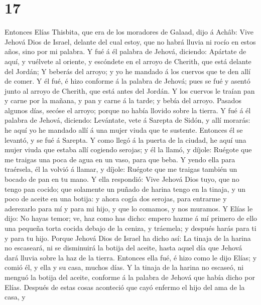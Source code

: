 \hypertarget{section-16}{%
\section{17}\label{section-16}}

 Entonces Elías Thisbita, que era de los moradores de
Galaad, dijo á Achâb: Vive Jehová Dios de Israel, delante del cual
estoy, que no habrá lluvia ni rocío en estos años, sino por mi palabra.
 Y fué á él palabra de Jehová, diciendo: 
Apártate de aquí, y vuélvete al oriente, y escóndete en el arroyo de
Cherith, que está delante del Jordán;  Y beberás del arroyo;
y yo he mandado á los cuervos que te den allí de comer.  Y
él fué, é hizo conforme á la palabra de Jehová; pues se fué y asentó
junto al arroyo de Cherith, que está antes del Jordán.  Y
los cuervos le traían pan y carne por la mañana, y pan y carne á la
tarde; y bebía del arroyo.  Pasados algunos días, secóse el
arroyo; porque no había llovido sobre la tierra.  Y fué á él
palabra de Jehová, diciendo:  Levántate, vete á Sarepta de
Sidón, y allí morarás: he aquí yo he mandado allí á una mujer viuda que
te sustente.  Entonces él se levantó, y se fué á Sarepta. Y
como llegó á la puerta de la ciudad, he aquí una mujer viuda que estaba
allí cogiendo serojas; y él la llamó, y díjole: Ruégote que me traigas
una poca de agua en un vaso, para que beba.  Y yendo ella
para traérsela, él la volvió á llamar, y díjole: Ruégote que me traigas
también un bocado de pan en tu mano.  Y ella respondió:
Vive Jehová Dios tuyo, que no tengo pan cocido; que solamente un puñado
de harina tengo en la tinaja, y un poco de aceite en una botija: y ahora
cogía dos serojas, para entrarme y aderezarlo para mí y para mi hijo, y
que lo comamos, y nos muramos.  Y Elías le dijo: No hayas
temor; ve, haz como has dicho: empero hazme á mí primero de ello una
pequeña torta cocida debajo de la ceniza, y tráemela; y después harás
para ti y para tu hijo.  Porque Jehová Dios de Israel ha
dicho así: La tinaja de la harina no escaseará, ni se disminuirá la
botija del aceite, hasta aquel día que Jehová dará lluvia sobre la haz
de la tierra.  Entonces ella fué, é hizo como le dijo
Elías; y comió él, y ella y su casa, muchos días.  Y la
tinaja de la harina no escaseó, ni menguó la botija del aceite, conforme
á la palabra de Jehová que había dicho por Elías.  Después
de estas cosas aconteció que cayó enfermo el hijo del ama de la casa, y

